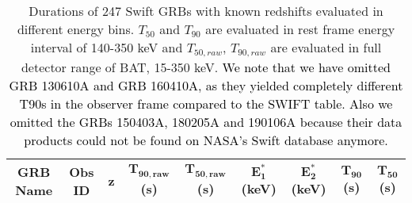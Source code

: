 \documentclass[prd,nofootinbib,preprintnumbers,floatfix]{revtex4}  %
\newcommand{\rthis}[1]{\textcolor{black}{#1}}
\begin{document}
\clearpage
\begin{center}
\begin{longtable*}{|c|c|c|c|c|c|c|c|c|}
    \caption{Durations of 247 Swift GRBs with known redshifts evaluated in different energy bins. $T_{50}$ and $T_{90}$ are evaluated in rest frame energy interval of 140-350 keV and $T_{50,raw}$, $T_{90,raw}$ are evaluated in full detector range of BAT, 15-350 keV. \rthis{We note that we have omitted GRB 130610A and GRB 160410A, as they yielded completely different T90s in the observer frame compared to the SWIFT table. Also we omitted the GRBs 150403A, 180205A and 190106A because their data products could not be found on NASA's Swift database anymore.}}
    \label{Table1:Swift_GRBs}\\
    \hline
    \textbf{GRB Name}  &  \textbf{Obs ID} & \textbf{z} & $\mathbf{T_{90,raw}}$(s) & $\mathbf{T_{50,raw}}$(s) & $\mathbf{E^{*}_1}$(keV) & $\mathbf{E^{*}_2}$(keV) & $\mathbf{T_{90}}$(s) & $\mathbf{T_{50}}$(s)\\
    \hline 

\end{longtable*}
\end{center}
\end{document}

